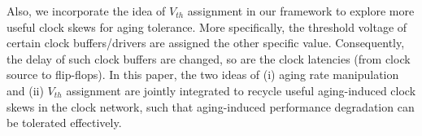 Also, we incorporate the idea of $V_{th}$ assignment in our framework to explore more useful clock skews for aging tolerance. More specifically, the threshold voltage of certain clock buffers/drivers are assigned the other specific value. Consequently, the delay of such clock buffers are changed, so are the clock latencies (from clock source to flip-flops). In this paper, the two ideas of (i) aging rate manipulation and (ii) $V_{th}$ assignment are jointly integrated to recycle useful aging-induced clock skews in the clock network, such that aging-induced performance degradation can be tolerated effectively.